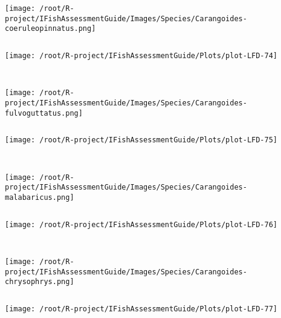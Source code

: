 \documentclass{report}\usepackage[]{graphicx}\usepackage[]{color}
\makeatletter
\def\maxwidth{ %
  \ifdim\Gin@nat@width>\linewidth
    \linewidth
  \else
    \Gin@nat@width
  \fi
}
\newenvironment{kframe}{%
 \def\at@end@of@kframe{}%
 \ifinner\ifhmode%
  \def\at@end@of@kframe{\end{minipage}}%
  \begin{minipage}{\columnwidth}%
 \fi\fi%
 \def\FrameCommand##1{\hskip\@totalleftmargin \hskip-\fboxsep
 \colorbox{shadecolor}{##1}\hskip-\fboxsep
     \hskip-\linewidth \hskip-\@totalleftmargin \hskip\columnwidth}%
 \MakeFramed {\advance\hsize-\width
   \@totalleftmargin\z@ \linewidth\hsize
   \@setminipage}}%
 {\par\unskip\endMakeFramed%
 \at@end@of@kframe}
\newenvironment{knitrout}{}{} %
\makeatother
\begin{document}
\begin{knitrout}
\begin{kframe}
\begin{verbatim}
\end{verbatim}
\end{kframe}
\texttt{[image: /root/R-project/IFishAssessmentGuide/Images/Species/Carangoides-coeruleopinnatus.png]}
\begin{kframe}\begin{verbatim}
\end{verbatim}
\end{kframe}
\texttt{[image: /root/R-project/IFishAssessmentGuide/Plots/plot-LFD-74]} 
\begin{kframe}\begin{verbatim}
 
\end{verbatim}
\end{kframe}
\texttt{[image: /root/R-project/IFishAssessmentGuide/Images/Species/Carangoides-fulvoguttatus.png]}
\begin{kframe}\begin{verbatim}
\end{verbatim}
\end{kframe}
\texttt{[image: /root/R-project/IFishAssessmentGuide/Plots/plot-LFD-75]} 
\begin{kframe}\begin{verbatim}
 
\end{verbatim}
\end{kframe}
\texttt{[image: /root/R-project/IFishAssessmentGuide/Images/Species/Carangoides-malabaricus.png]}
\begin{kframe}\begin{verbatim}
\end{verbatim}
\end{kframe}
\texttt{[image: /root/R-project/IFishAssessmentGuide/Plots/plot-LFD-76]} 
\begin{kframe}\begin{verbatim}
 
\end{verbatim}
\end{kframe}
\texttt{[image: /root/R-project/IFishAssessmentGuide/Images/Species/Carangoides-chrysophrys.png]}
\begin{kframe}\begin{verbatim}
\end{verbatim}
\end{kframe}
\texttt{[image: /root/R-project/IFishAssessmentGuide/Plots/plot-LFD-77]} 
\begin{kframe}\begin{verbatim}
 

\end{verbatim}
\end{kframe}
\end{knitrout}
\end{document}
